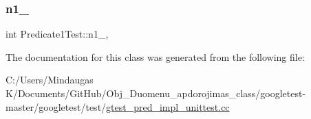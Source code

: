 \mbox{\label{class_predicate1_test_a528d9f7f618b17802962a3824eea11e3}} 
\subsubsection{\texorpdfstring{n1\_}{n1\_}}
{\footnotesize\ttfamily int Predicate1\+Test\+::n1\+\_\+\hspace{0.3cm}{\ttfamily [static]}, {\ttfamily [protected]}}



The documentation for this class was generated from the following file\+:\begin{DoxyCompactItemize}
\item 
C\+:/\+Users/\+Mindaugas K/\+Documents/\+Git\+Hub/\+Obj\+\_\+\+Duomenu\+\_\+apdorojimas\+\_\+class/googletest-\/master/googletest/test/\mbox{\hyperlink{googletest-master_2googletest_2test_2gtest__pred__impl__unittest_8cc}{gtest\+\_\+pred\+\_\+impl\+\_\+unittest.\+cc}}\end{DoxyCompactItemize}
